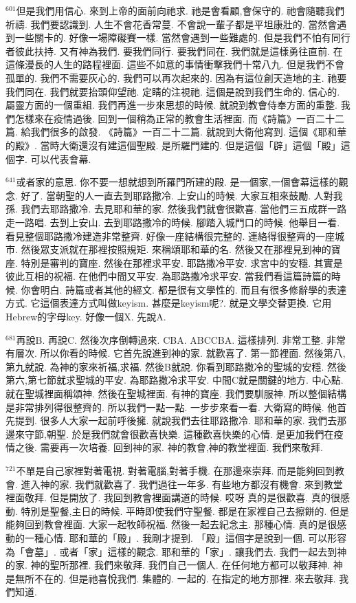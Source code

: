 \documentclass{book}
\begin{document}
$^{601}$但是我們用信心.
來到上帝的面前向祂求.
祂是會看顧,會保守的.
祂會隨聽我們祈禱.
我們要認識到.
人生不會花香常蔓.
不會說一輩子都是平坦康壯的.
當然會遇到一些關卡的.
好像一場障礙賽一樣.
當然會遇到一些難處的.
但是我們不怕有同行者彼此扶持.
又有神為我們.
要我們同行.
要我們同在.
我們就是這樣勇往直前.
在這條漫長的人生的路程裡面.
這些不如意的事情衝擊我們十常八九.
但是我們不會孤單的.
我們不需要灰心的.
我們可以再次起來的.
因為有這位創天造地的主.
祂要我們同在.
我們就要抬頭仰望祂.
定睛的注視祂.
這個是說到我們生命的.
信心的.
屬靈方面的一個重組.
我們再進一步來思想的時候.
就說到教會侍奉方面的重整.
我們怎樣來在疫情過後.
回到一個稍為正常的教會生活裡面.
而《詩篇》一百二十二篇.
給我們很多的啟發.
《詩篇》一百二十二篇.
就說到大衛他寫到.
這個《耶和華的殿》.
當時大衛還沒有建這個聖殿.
是所羅門建的.
但是這個「辟」這個「殿」這個字.
可以代表會幕.

$^{641}$或者家的意思.
你不要一想就想到所羅門所建的殿.
是一個家,一個會幕這樣的觀念.
好了.
當朝聖的人一直去到耶路撒冷.
上安山的時候.
大家互相來鼓勵.
人對我孫.
我們去耶路撒冷.
去見耶和華的家.
然後我們就會很歡喜.
當他們三五成群一路走一路唱.
去到上安山.
去到耶路撒冷的時候.
腳踏入城門口的時候.
他舉目一看.
看見整個耶路撒冷建造非常整齊.
好像一座結構很完整的.
連絡得很整齊的一座城市.
然後眾支派就在那裡按照規矩.
來稱頌耶和華的名.
然後又在那裡見到神的寶座.
特別是審判的寶座.
然後在那裡求平安.
耶路撒冷平安.
求宮中的安穩.
其實是彼此互相的祝福.
在他們中間又平安.
為耶路撒冷求平安.
當我們看這篇詩篇的時候.
你會明白.
詩篇或者其他的經文.
都是很有文學性的.
而且有很多修辭學的表達方式.
它這個表達方式叫做keyism.
甚麼是keyism呢?.
就是文學交替更換.
它用Hebrew的字母key.
好像一個X.
先說A.

$^{681}$再說B.
再說C.
然後次序倒轉過來.
CBA.
ABCCBA.
這樣排列.
非常工整.
非常有層次.
所以你看的時候.
它首先說進到神的家.
就歡喜了.
第一節裡面.
然後第八,第九就說.
為神的家來祈福,求福.
然後B就說.
你看到耶路撒冷的聖城的安穩.
然後第六,第七節就求聖城的平安.
為耶路撒冷求平安.
中間C就是關鍵的地方.
中心點.
就在聖城裡面稱頌神.
然後在聖城裡面.
有神的寶座.
我們要馴服神.
所以整個結構是非常排列得很整齊的.
所以我們一點一點.
一步步來看一看.
大衛寫的時候.
他首先提到.
很多人大家一起前呼後擁.
就說我們去往耶路撒冷.
耶和華的家.
我們去那邊來守節,朝聖.
於是我們就會很歡喜快樂.
這種歡喜快樂的心情.
是更加我們在疫情之後.
需要再一次培養.
回到神的家.
神的教會,神的教堂裡面.
我們來敬拜.

$^{721}$不單是自己家裡對著電視.
對著電腦,對著手機.
在那邊來崇拜.
而是能夠回到教會.
進入神的家.
我們就歡喜了.
我們過往一年多.
有些地方都沒有機會.
來到教堂裡面敬拜.
但是開放了.
我回到教會裡面講道的時候.
哎呀 真的是很歡喜.
真的很感動.
特別是聖餐,主日的時候.
平時即使我們守聖餐.
都是在家裡自己去擦餅的.
但是能夠回到教會裡面.
大家一起牧師祝福.
然後一起去紀念主.
那種心情.
真的是很感動的一種心情.
耶和華的「殿」.
我剛才提到.
「殿」這個字是說到一個.
可以形容為「會墓」.
或者「家」這樣的觀念.
耶和華的「家」.
讓我們去.
我們一起去到神的家.
神的聖所那裡.
我們來敬拜.
我們自己一個人.
在任何地方都可以敬拜神.
神是無所不在的.
但是祂喜悅我們.
集體的.
一起的.
在指定的地方那裡.
來去敬拜.
我們知道.
\end{document}
